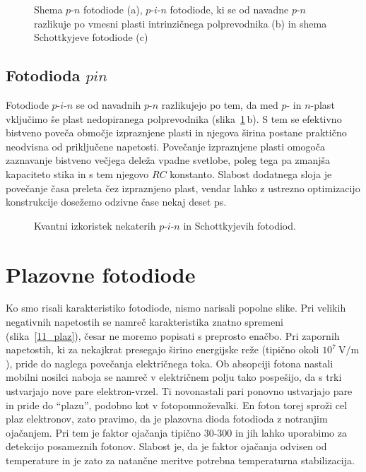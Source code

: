 \begin{figure}[h]
\centering
\def\svgwidth{140truemm} 

\caption{Shema $p$-$n$ fotodiode (a), $p$-$i$-$n$ fotodiode, ki se od navadne 
$p$-$n$ razlikuje po vmesni plasti intrinzičnega
polprevodnika (b) in shema Schottkyjeve fotodiode (c)}
\label{11_shema}
\end{figure}

\subsection*{Fotodioda $pin$}
Fotodiode $p$-$i$-$n$ se od navadnih $p$-$n$ razlikujejo po tem, da med $p$- in $n$-plast 
vključimo še plast nedopiranega polprevodnika (slika~\ref{11_shema}\,b). S tem se efektivno bistveno poveča območje
izpraznjene plasti in njegova širina postane praktično neodvisna od priključene napetosti.
Povečanje izpraznjene plasti omogoča zaznavanje bistveno večjega deleža vpadne svetlobe, 
poleg tega pa zmanjša kapaciteto stika in s tem njegovo $RC$ konstanto. Slabost dodatnega
sloja je povečanje časa preleta čez izpraznjeno plast, vendar lahko
z ustrezno optimizacijo konstrukcije dosežemo odzivne čase nekaj deset ps.

\begin{figure}[h]
\centering
\def\svgwidth{100truemm} 

\caption{Kvantni izkoristek nekaterih $p$-$i$-$n$ in Schottkyjevih fotodiod.}
\label{11_odziv}
\end{figure}

\section{Plazovne fotodiode}
Ko smo risali karakteristiko fotodiode, nismo narisali popolne slike. 
Pri velikih negativnih napetostih se namreč karakteristika znatno spremeni (slika~\ref{11_plaz}), 
česar ne moremo popisati s preprosto enačbo. Pri zapornih napetostih, ki za nekajkrat presegajo 
širino energijske reže (tipično okoli $10^7~\si{\volt}/\si{\meter}$), 
pride do naglega povečanja električnega toka. Ob absopciji fotona nastali
mobilni nosilci naboja se namreč v električnem polju tako pospešijo, da s trki ustvarjajo nove pare 
elektron-vrzel. Ti novonastali pari ponovno ustvarjajo pare in pride do ``plazu'', podobno kot v 
fotopomnoževalki. En foton torej sproži cel plaz elektronov, zato pravimo, da je plazovna dioda
fotodioda z notranjim ojačanjem. Pri tem je faktor ojačanja tipično $30$-$300$ in jih lahko 
uporabimo za detekcijo posameznih fotonov. Slabost je, da je faktor ojačanja odvisen od
temperature in je zato za natančne meritve potrebna temperaturna stabilizacija.

